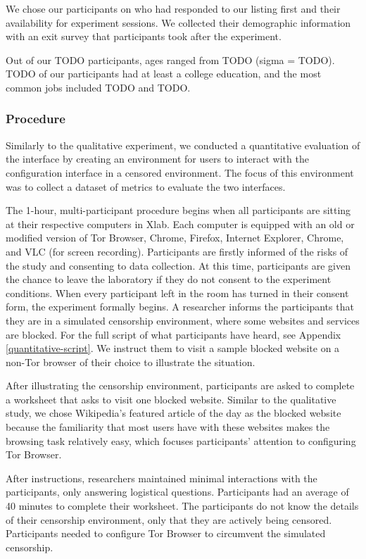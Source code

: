 \documentclass{template}
\begin{document}
We chose our participants on who had responded to our listing first and their
availability for experiment sessions. We collected their demographic information
with an exit survey that participants took after the experiment. 

Out of our {\color {red} TODO} participants, ages ranged from {\color {red} TODO}
(sigma = {\color {red} TODO}). {\color {red} TODO} of our participants had at least
a college education, and the most common jobs included {\color {red} TODO} and
{\color {red} TODO}. 

\subsubsection{Procedure}
Similarly to the qualitative experiment, we conducted a quantitative evaluation 
of the interface by creating an environment  for users to interact with the 
configuration interface in a censored environment. The focus of this environment 
was to collect a dataset of metrics to evaluate the two interfaces. 

The 1-hour, multi-participant procedure begins when all participants are sitting at their
respective computers in Xlab. Each computer is equipped with an old or modified version
of Tor Browser, Chrome, Firefox, Internet Explorer,  Chrome, and VLC (for screen recording). 
Participants are firstly informed of the risks of the study and consenting to data collection.  At
this time, participants are given the chance to leave the laboratory if they do not consent to 
the experiment conditions. When every participant left in the room has turned in their consent
form, the experiment formally begins. A researcher informs the participants that they are in a
simulated censorship environment, where some websites and services are blocked. 
For the full script of what participants have heard, see Appendix \ref{quantitative-script}. We
instruct them to visit a sample blocked website on a non-Tor browser of their choice to illustrate 
the situation.

After illustrating the censorship environment, participants are asked to 
complete a worksheet that asks to visit one blocked website. 
Similar to the qualitative study, we chose Wikipedia's featured article of the day 
as the blocked website because the familiarity 
that most users have with these websites makes the browsing task relatively easy, 
which focuses participants' attention to configuring Tor Browser. 

After instructions, researchers maintained minimal interactions with the participants, 
only answering logistical questions. Participants had an 
average of 40 minutes to complete their worksheet. 
The participants do not know the details of their censorship environment,
only that they are actively being censored. Participants needed to configure Tor Browser to 
circumvent the simulated censorship. 
\end{document}
